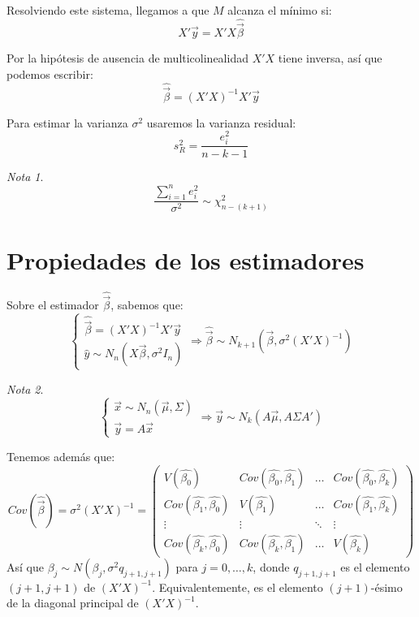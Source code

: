 \documentclass{report}
\theoremstyle{remark}
\theoremstyle{remark}
\newtheorem*{note}{Nota}
\theoremstyle{remark}
\theoremstyle{definition}
\theoremstyle{definition}
\theoremstyle{definition}
\begin{document}
Resolviendo este sistema, llegamos a que $M$ alcanza el mínimo si:
$$X'\vec{y} = X'X\hat{\vec{\beta}}$$

Por la hipótesis de ausencia de multicolinealidad $X'X$ tiene inversa, así que podemos escribir:
$$\hat{\vec{\beta}} = (X'X)^{-1}X'\vec{y}$$

Para estimar la varianza $\sigma^2$ usaremos la varianza residual:
$$s_R^2 = \frac{e_i^2}{n-k-1}$$

\begin{note}
    $$\frac{\sum_{i=1}^n e_i^2}{\sigma^2} \sim \chi^2_{n-(k+1)}$$
\end{note}

\section{Propiedades de los estimadores}
Sobre el estimador $\hat{\vec{\beta}}$, sabemos que:
$$\begin{cases}
        \hat{\vec{\beta}} = (X'X)^{-1}X'\vec{y} \\
        \hat{y} \sim N_n(X\vec{\beta}, \sigma^2 I_n)
    \end{cases} \Rightarrow \hat{\vec{\beta}} \sim N_{k+1}(\vec{\beta}, \sigma^2(X'X)^{-1})$$

\begin{note}
    $$\begin{cases}
            \vec{x} \sim N_n(\vec{\mu}, \Sigma) \\
            \vec{y} = A\vec{x}
        \end{cases} \Rightarrow \vec{y} \sim N_k(A\vec{\mu}, A\Sigma A')$$
\end{note}

Tenemos además que:
$$Cov(\hat{\vec{\beta}}) = \sigma^2(X'X)^{-1} = \begin{pmatrix}
        V(\hat{\beta_0})                  & Cov(\hat{\beta_0}, \hat{\beta_1}) & \dots  & Cov(\hat{\beta_0}, \hat{\beta_k}) \\
        Cov(\hat{\beta_1}, \hat{\beta_0}) & V(\hat{\beta_1})                  & \dots  & Cov(\hat{\beta_1}, \hat{\beta_k}) \\
        \vdots                            & \vdots                            & \ddots & \vdots                            \\
        Cov(\hat{\beta_k}, \hat{\beta_0}) & Cov(\hat{\beta_k}, \hat{\beta_1}) & \dots  & V(\hat{\beta_k})
    \end{pmatrix}$$
Así que $\hat{\beta_j} \sim N(\beta_j, \sigma^2 q_{j+1, j+1})$ para $j = 0, \dots, k$, donde $q_{j+1, j+1}$ es el elemento $(j+1, j+1)$ de $(X'X)^{-1}$.
Equivalentemente, es el elemento $(j+1)$-ésimo de la diagonal principal de $(X'X)^{-1}$.
\end{document}
